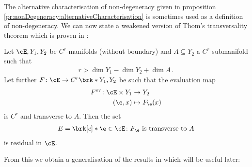 The alternative characterisation of non-degeneracy given in proposition \ref{pr:nonDegeneracy:alternativeCharacterisation}
is sometimes used as a definition of non-degeneracy.
We can now state a weakened version of Thom's transversality theorem which is proven in \cite[§3 Theorem 2.7]{Hirsch1994}:
\begin{theorem}
  Let $\cE,Y_1,Y_2$ be $C^r$-manifolds (without boundary) and $A\subseteq Y_2$ a $C^r$ submanifold such that
  \begin{align*}
    r>\dim Y_1-\dim Y_2+\dim A\,.
  \end{align*}
  Let further $F\colon \cE\to C^r\brk*{Y_1,Y_2}$ be such that the evaluation map
  \begin{align*}
    F^\text{ev}\colon \cE\times Y_1&\to Y_2 \\
    (\e,x)&\mapsto F_\e(x)
  \end{align*}
  is $C^r$ and transverse to $A$.
  Then the set
  \begin{align*}
    E=\brk[c]*{\e\in \cE\colon F_\e\text{ is transverse to } A}
  \end{align*}
  is residual in $\cE$.
\end{theorem}
From this we obtain
a generalisation of the results in \cite[§2]{Morse1970} which will be useful later:
